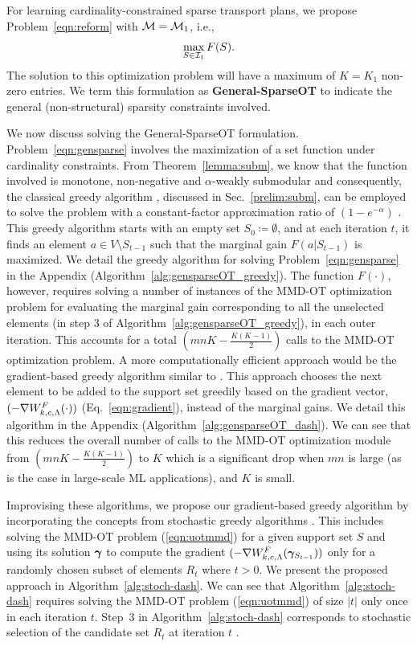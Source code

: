 For learning cardinality-constrained sparse transport plans, we propose Problem~\ref{eqn:reform} with $\mathcal{M} = \mathcal{M}_1$, i.e., 
\begin{equation}\label{eqn:gensparse}
\max\limits_{S\in \mathcal{I}_1} F(S). 
\end{equation}
The solution to this optimization problem will have a maximum of $K=K_1$ non-zero entries. We term this formulation as \textbf{General-SparseOT} to indicate the general (non-structural) sparsity constraints involved. 

We now discuss solving the General-SparseOT formulation.
Problem~\ref{eqn:gensparse} involves the maximization of a set function under cardinality constraints. From Theorem~\ref{lemma:subm}, we know that the function involved is monotone, non-negative and $\alpha$-weakly submodular and consequently, the classical greedy algorithm \citep{DasKempe18}, discussed in Sec.~\ref{prelim:subm}, can be employed to solve the problem with a constant-factor approximation ratio of $(1-e^{-\alpha})$ \citep{DasKempe18}.
This greedy algorithm starts with an empty set $S_0 \coloneqq \emptyset$, and at each iteration $t$, it finds an element $a\in V\setminus S_{t-1}$ such that the marginal gain $F(a|S_{t-1})$ is maximized.
We detail the greedy algorithm for solving Problem~\ref{eqn:gensparse} in the Appendix (Algorithm~\ref{alg:gensparseOT_greedy}). The function $F(\cdot)$, however, requires solving a number of instances of the MMD-OT optimization problem for evaluating the marginal gain corresponding to all the unselected elements (in step 3 of Algorithm~\ref{alg:gensparseOT_greedy}), in each outer iteration. This accounts for a total $\left(mnK-\frac{K(K-1)}{2}\right)$ calls to the MMD-OT optimization problem. A more computationally efficient approach would be the gradient-based greedy algorithm similar to \citet[Algorithm (2)]{gurumoorthy19a}. This approach chooses the next element to be added to the support set greedily based on the gradient vector, $(-\nabla W^F_{k, c, \Lambda}(\cdot))$ (Eq.~\ref{eqn:gradient}), instead of the marginal gains. We detail this algorithm in the Appendix (Algorithm~\ref{alg:gensparseOT_dash}). We can see that this reduces the overall number of calls to the MMD-OT optimization module from $\left(mnK-\frac{K(K-1)}{2}\right)$ to $K$ which is a significant drop when $mn$ is large (as is the case in large-scale ML applications), and $K$ is small. 

Improvising these algorithms, we propose our gradient-based greedy algorithm by incorporating the concepts from stochastic greedy algorithms \citep{mirzasoleiman15a,Khanna2017ScalableGF}. This includes solving the MMD-OT problem (\ref{eqn:uotmmd}) for a given support set $S$ and using its solution $\bm{\gamma}$ to compute the gradient $(-\nabla W^F_{k, c, \Lambda}(\bm{\gamma}_{S_{t-1}}))$ only for a randomly chosen subset of elements $R_t$ where $t>0$. We present the proposed approach in Algorithm~\ref{alg:stoch-dash}. We can see that Algorithm~\ref{alg:stoch-dash} requires solving the MMD-OT problem (\ref{eqn:uotmmd}) of size $|t|$ only once in each iteration $t$. Step~3 in Algorithm~\ref{alg:stoch-dash} corresponds to stochastic selection of the candidate set $R_t$ at iteration $t$ \citep{mirzasoleiman15a,Khanna2017ScalableGF}. 

